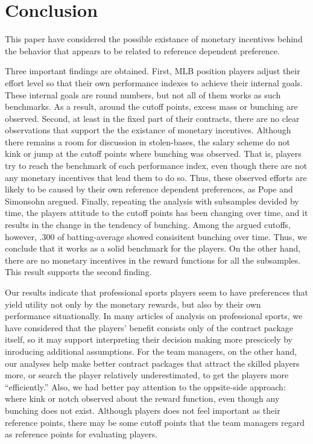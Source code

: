 \documentclass[dvipdfmx, 12pt]{article}
\begin{document}





\section{Conclusion}

This paper have considered the possible existance of monetary incentives behind the behavior that appears to be related to reference dependent preference.

Three important findings are obtained. First, MLB position players adjust their effort level so that their own performance indexes to achieve their internal goals. These internal goals are round numbers, but not all of them works as such benchmarks. As a result, around the cutoff points, excess mass or bunching are observed. Second, at least in the fixed part of their contracts, there are no clear observations that support the the existance of monetary incentives. Although there remains a room for discussion in stolen-bases, the salary scheme do not kink or jump at the cutoff points where bunching was observed. That is, players try to reach the benchmark of each performance index, even though there are not any monetary incentives that lead them to do so. Thus, these observed efforts are likely to be caused by their own reference dependent preferences, as Pope and Simonsohn aregued. Finally, repeating the analysis with subsamples devided by time, the players attitude to the cutoff points has been changing over time, and it results in the change in the tendency of bunching. Among the argued cutoffs, however, .300 of batting-average showed consisitent bunching over time. Thus, we conclude that it works as a solid benchmark for the players. On the other hand, there are no monetary incentives in the reward functions for all the subsamples. This result supports the second finding.

Our results indicate that professional sports players seem to have preferences that yield utility not only by the monetary rewards, but also by their own performance situationally. In many articles of analysis on professional sports, we have considered that the players' benefit consists only of the contract package itself, so it may support interpreting their decision making more prescicely by inroducing additional assumptions. For the team managers, on the other hand, our analyses help make better contract packages that attract the skilled players more, or search the player relatively underestimated, to get the players more ``efficiently.'' Also, we had better pay attention to the oppsite-side approach: where kink or notch observed about the reward function, even though any bunching does not exist. Although players does not feel important as their reference points, there may be some cutoff points that the team managers regard as reference points for evaluating players.
\end{document}

